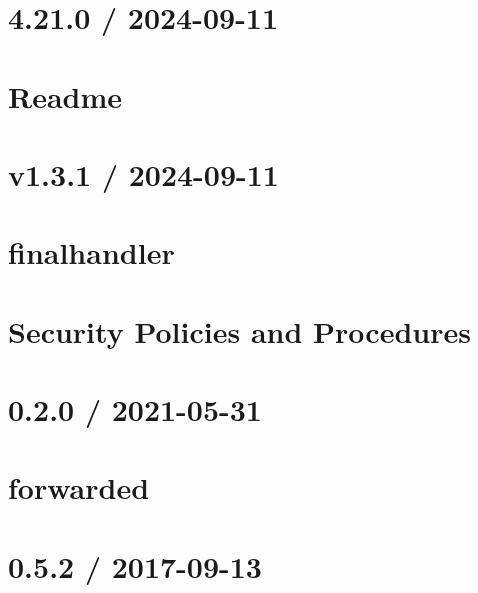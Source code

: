 \documentclass[twoside]{book}
\newcommand{\+}{\discretionary{\mbox{\scriptsize$\hookleftarrow$}}{}{}}
\begin{document}
\chapter{4.21.0 / 2024-\/09-\/11}
\label{md_src_nodejs_node_modules_express_History}

\chapter{Readme}
\label{md_src_nodejs_node_modules_express_Readme}

\chapter{v1.3.1 / 2024-\/09-\/11}
\label{md_src_nodejs_node_modules_finalhandler_HISTORY}

\chapter{finalhandler}
\label{md_src_nodejs_node_modules_finalhandler_README}

\chapter{Security Policies and Procedures}
\label{md_src_nodejs_node_modules_finalhandler_SECURITY}

\chapter{0.2.0 / 2021-\/05-\/31}
\label{md_src_nodejs_node_modules_forwarded_HISTORY}

\chapter{forwarded}
\label{md_src_nodejs_node_modules_forwarded_README}

\chapter{0.5.2 / 2017-\/09-\/13}
\label{md_src_nodejs_node_modules_fresh_HISTORY}

\end{document}

